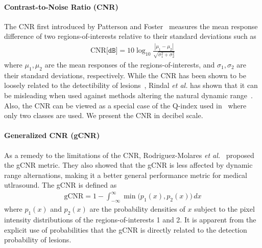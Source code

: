 \paragraph{Contrast-to-Noise Ratio (CNR)}
The CNR first introduced by Patterson and Foster~\cite{patterson_improvement_1983} measures the mean response difference of two regions-of-interests relative to their standard deviations such as
\begin{align}
  \mathrm{CNR} \texttt{[dB]} = 10 \log_{10} \frac{| \mu_{1} - \mu_{2} |}{ \sqrt{\sigma^2_1 + \sigma^2_2} }
\end{align}
where \(\mu_1, \mu_2\) are the mean responses of the regions-of-interests, and \(\sigma_1, \sigma_2\) are their standard deviations, respectively.
While the CNR has been shown to be loosely related to the detectibility of lesions~\cite{smith_ultrasound_1984}, Rindal \textit{et al.} has shown that it can be misleading when used against methods altering the natural dynamic range~\cite{rindal_effect_2019}.
Also, the CNR can be viewed as a special case of the Q-index used in~\cite{tay_ultrasound_2006} where only two classes are used.
We present the CNR in decibel scale.


\paragraph{Generalized CNR (gCNR)}
As a remedy to the limitations of the CNR, Rodriguez-Molares \textit{et al.}~\cite{rodriguez-molares_generalized_2020} proposed the gCNR metric.
They also showed that the gCNR is less affected by dynamic range alternations, making it a better general performance metric for medical utlrasound.
The gCNR is defined as
\begin{align}
  \text{gCNR} = 1 - \int_{-\infty}^{\infty} \min\big(p_1\left(x\right), p_2\left(x\right)\big) \, dx
\end{align}
where \(p_1\left(x\right)\) and \(p_2\left(x\right)\) are the probability densities of \(x\) subject to the pixel intensity distributions of the regions-of-interests 1 and 2.
It is apparent from the explicit use of probabilities that the gCNR is directly related to the detection probability of lesions.

